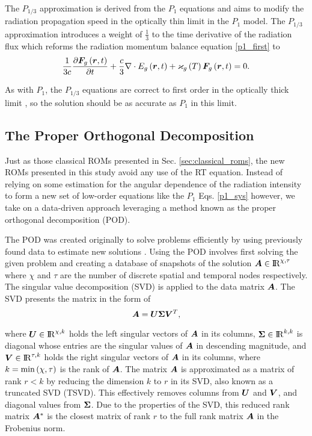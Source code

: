 	\ind The $P_{1/3}$ approximation \cite{olson-auer-hall-2000} is derived from the $P_1$ equations and aims to modify the radiation propagation speed in the optically thin limit in the $P_1$ model. The $P_{1/3}$ approximation introduces a weight of $\frac{1}{3}$ to the time derivative of the radiation flux which reforms the radiation momentum balance equation \eqref{p1_first} to
	\begin{equation}
		\frac{1}{3c}\frac{\partial \bm{F}_g\left(\bm{r},t\right)}{\partial t} + \frac{c}{3}\nabla\cdot E_g\left(\bm{r},t\right) + \varkappa_{g}\left( T\right)\bm{F}_g\left(\bm{r},t\right) = 0.
	\end{equation}

	As with $P_1$, the $P_{1/3}$ equations are correct to first order in the optically thick limit \cite{Morel-2000}, so the solution should be as accurate as $P_1$ in this limit.
	
\subsection{The Proper Orthogonal Decomposition} \label{sec:pod}
	Just as those classical ROMs presented in Sec. \ref{sec:classical_roms}, the new ROMs presented in this study avoid any use of the RT equation. Instead of relying on some estimation for the angular dependence of the radiation intensity to form a new set of low-order equations like the $P_1$ Eqs. \eqref{p1_sys} however, we take on a data-driven approach leveraging a method known as the proper orthogonal decomposition (POD).
	
	\ind The POD was created originally to solve problems efficiently by using previously found data to estimate new solutions \cite{lumley-1981,Aubry-pod-1991,smith-moehlis-holmes-2005}. Using the POD involves first solving the given problem and creating a database of snapshots of the solution $\bm{A}\in{\rm I\!R}^{\chi,\tau}$ where $\chi$ and $\tau$ are the number of discrete spatial and temporal nodes respectively. The singular value decomposition (SVD) is applied to the data matrix $\bm{A}$. The SVD  presents the matrix in the form of 
	\begin{equation}
		\bm{A} = \bm{U}\bm{\Sigma}\bm{V}^T, \label{svd_form}
	\end{equation}
	
	where $\bm{U} \in {\rm I\!R}^{\chi,k}$ holds the left singular vectors of $\bm{A}$ in its columns, $\bm{\Sigma} \in {\rm I\!R}^{k,k}$ is diagonal whose entries are the singular values of $\bm{A}$ in descending magnitude, and $\bm{V} \in {\rm I\!R}^{\tau,k}$ holds the right singular vectors of $\bm{A}$ in its columns, where $k = \min\left(\chi,\tau\right)$ is the rank of $\bm{A}$. The matrix $\bm{A}$ is approximated as a matrix of rank $r<k$ by reducing the dimension $k$ to $r$ in its SVD, also known as a truncated SVD (TSVD). This effectively removes columns from $\bm{U}$ and $\bm{V}$, and diagonal values from $\bm{\Sigma}$. Due to the properties of the SVD, this reduced rank matrix $\bm{A}^*$ is the closest matrix of rank $r$ to the full rank matrix $\bm{A}$ in the Frobenius norm.
	
